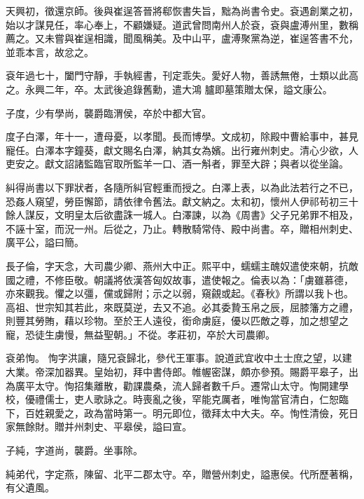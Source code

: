 \begin{pinyinscope}
 天興初，徵還京師。後與崔逞答晉將郗恢書失旨，黜為尚書令史。袞遇創業之初，始以才謀見任，率心奉上，不顧嫌疑。道武曾問南州人於袞，袞與盧溥州里，數稱薦之。又未嘗與崔逞相識，聞風稱美。及中山平，盧溥聚黨為逆，崔逞答書不允，並乖本言，故忿之。



 袞年過七十，闔門守靜，手執經書，刊定乖失。愛好人物，善誘無倦，士類以此高之。永興二年，卒。太武後追錄舊勳，遣大鴻
 臚即墓策贈太保，謚文康公。



 子度，少有學尚，襲爵臨渭侯，卒於中都大官。



 度子白澤，年十一，遭母憂，以孝聞。長而博學。文成初，除殿中曹給事中，甚見寵任。白澤本字鐘葵，獻文賜名白澤，納其女為嬪。出行雍州刺史。清心少欲，人吏安之。獻文詔諸監臨官取所監羊一口、酒一斛者，罪至大辟；與者以從坐論。



 糾得尚書以下罪狀者，各隨所糾官輕重而授之。白澤上表，以為此法若行之不已，恐姦人窺望，勞臣懈節，請依律令舊法。獻文納之。太和初，懷州人伊祁茍初三十餘人謀反，文明皇太后欲盡誅一城人。白澤諫，以為《周書》父子兄弟罪不相及，
 不誣十室，而況一州。后從之，乃止。轉散騎常侍、殿中尚書。卒，贈相州刺史、廣平公，謚曰簡。



 長子倫，字天念，大司農少卿、燕州大中正。熙平中，蠕蠕主醜奴遣使來朝，抗敵國之禮，不修臣敬。朝議將依漢答匈奴故事，遣使報之。倫表以為：「虜雖慕德，亦來觀我。懼之以彊，儻或歸附；示之以弱，窺覦或起。《春秋》所謂以我卜也。高祖、世宗知其若此，來既莫逆，去又不追。必其委贄玉帛之辰，屈膝籓方之禮，則豐其勞賄，藉以珍物。至於王人遠役，銜命虜庭，優以匹敵之尊，加之想望之寵，恐徒生虜慢，無益聖朝。」不從。孝莊初，卒於大司農卿。



 袞弟恂。
 恂字洪讓，隨兄袞歸北，參代王軍事。說道武宜收中土士庶之望，以建大業。帝深加器異。皇始初，拜中書侍郎。帷幄密謀，頗亦參預。賜爵平皋子，出為廣平太守。恂招集離散，勸課農桑，流人歸者數千戶。遷常山太守。恂開建學校，優禮儒士，吏人歌詠之。時喪亂之後，罕能克厲者，唯恂當官清白，仁恕臨下，百姓親愛之，政為當時第一。明元即位，徵拜太中大夫。卒。恂性清儉，死日家無餘財。贈并州刺史、平皋侯，謚曰宣。



 子純，字道尚，襲爵。坐事除。



 純弟代，字定燕，陳留、北平二郡太守。卒，贈營州刺史，謚惠侯。代所歷著稱，有父遺風。




\end{pinyinscope}
